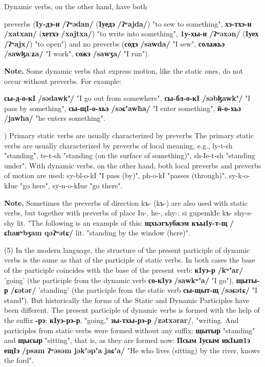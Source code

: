\documentclass[a4paper,12pt]{book}
\newcommand{\1}[1]{\textbf{\emph{#1}}} %
\newcommand{\2}[1]{\textbf{[#1]}} %
\newcommand{\3}[1]{\fontsize{11pt}{0cm}\textbf{\emph{#1}}} %
\newcommand{\4}[1]{\fontsize{10pt}{0cm}\emph{#1}}	%
\newcommand{\5}[1]{\textbf{/#1/}} %
\newcommand{\6}[1]{\textbf{[#1]}} %
\newcommand{\7}[1]{\fontsize{12pt}{0cm}\emph{#1}} %
\newcommand{\8}[1]{\fontsize{12pt}{0cm}`#1'} %
\newcommand{\9}[1]{\fontsize{12pt}{0cm}(lit. `#1')} %
\newcommand{\glossphonemics}[1]{\textbf{/#1/}} %
\begin{document}
\begin{xlist}
Dynamic verbs, on the other hand, have both 

\begin{xlist}
\ex preverbs (\textbf{Iy-дэ-н} \glossphonemics{ʔʷədan} (\textbf{Iуедэ} \glossphonemics{ʔʷajda}) "to sew to something", \textbf{хэ-тхэ-н} \glossphonemics{xatxan} (\textbf{хетхэ} \glossphonemics{xajtxa}) "to write into something", \textbf{1у-хы-н} \glossphonemics{ʔʷəxən} (\textbf{Iуех} \glossphonemics{ʔʷajx}) "to open") 
\ex and no preverbs (\textbf{содэ} \glossphonemics{sawda} "I sew", \textbf{солажьэ} \glossphonemics{sawɮaːʑa} "I work", \textbf{сожэ} \glossphonemics{sawʒa} "I run").
\end{xlist}

\textbf{Note.} Some dynamic verbs that express motion, like the static ones, do not occur without preverbs. For example: 
\begin{xlist}
\ex \textbf{сы-д-о-кI} \glossphonemics{sədawkʼ} "I go out from somewhere", \textbf{сы-бл-о-кI} \glossphonemics{səbɮawkʼ} "I pass by something", \textbf{сы-щI-о-хьэ} \glossphonemics{səɕʼawħa} "I enter something", \textbf{й-о-хьэ} \glossphonemics{jawħa} "he enters something".
\end{xlist}

) Primary static verbs are usually characterized by preverbs The primary static verbs are usually characterized by preverbs of local meaning, e.g., ly-t-sh "standing", te-t-sh "standing (on the surface of something)", sh-Ie-t-sh "standing under". With dynamic verbs, on the other hand, both local preverbs and preverbs of motion are used: sy-bl-o-kI "I pass (by)", ph-o-kI "passes (through)", sy-k-o-kIue "go here", sy-n-o-kIue "go there".

\textbf{Note.} Sometimes the preverbs of direction kъ- (kъ-) are also used with static verbs, but together with preverbs of place Iu-, he-, shy-: si gupemkIe kъ- shy-s-shy lit. "The following is an example of this: \textbf{щхьэгъубжэм къыIу-т-щ} \glossphonemics{ɕħaʁʷbʒam qəʔʷətɕ} lit. "standing by the window (here)".

\ex (5) In the modern language, the structure of the present participle of dynamic verbs is the same as that of the participle of static verbs. In both cases the base of the participle coincides with the base of the present verb: \textbf{кIуэ-р} \glossphonemics{kʷʼar} 'going' (the participle from the dynamic verb \textbf{со-кIуэ} \glossphonemics{sawkʷʼa} "I go"), \textbf{щыты-р} \glossphonemics{ɕətər} 'standing' (the participle from the static verb \textbf{сы-щыт-щ} \glossphonemics{səɕətɕ} "I stand"). But historically the forms of the Static and Dynamic Participles have been different. The present participle of dynamic verbs is formed with the help of the suffix \textbf{-рэ}: \textbf{кIуэ-рэ-р}, "going," \textbf{зы-тхы-рэ-р} \glossphonemics{zətxərar}, "writing. And participles from static verbs were formed without any suffix: \textbf{щытыр} "standing" and \textbf{щысыр} "sitting", that is, as they are formed now: \textbf{Псым Iусым икIып1э ещIэ} \glossphonemics{psam ʔʷəsəm jəkʼəpʼa jaɕʼa} "He who lives (sitting) by the river, knows the ford".


\end{xlist}
\end{document}
